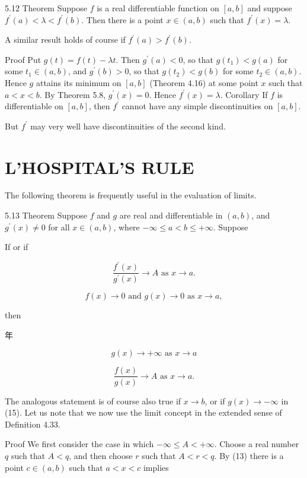 \documentclass[10pt]{article}
\begin{document}
5.12 Theorem Suppose $f$ is a real differentiable function on $[a, b]$ and suppose $f^{\prime}(a)<\lambda<f^{\prime}(b)$. Then there is a point $x \in(a, b)$ such that $f^{\prime}(x)=\lambda$.

A similar result holds of course if $f^{\prime}(a)>f^{\prime}(b)$.

Proof Put $g(t)=f(t)-\lambda t$. Then $g^{\prime}(a)<0$, so that $g\left(t_{1}\right)<g(a)$ for some $t_{1} \in(a, b)$, and $g^{\prime}(b)>0$, so that $g\left(t_{2}\right)<g(b)$ for some $t_{2} \in(a, b)$. Hence $g$ attains its minimum on $[a, b]$ (Theorem 4.16) at some point $x$ such that $a<x<b$. By Theorem 5.8, $g^{\prime}(x)=0$. Hence $f^{\prime}(x)=\lambda$. Corollary If $f$ is differentiable on $[a, b]$, then $f^{\prime}$ cannot have any simple discontinuities on $[a, b]$.

But $f^{\prime}$ may very well have discontinuities of the second kind.

\section{L'HOSPITAL'S RULE}
The following theorem is frequently useful in the evaluation of limits.

5.13 Theorem Suppose $f$ and $g$ are real and differentiable in $(a, b)$, and $g^{\prime}(x) \neq 0$ for all $x \in(a, b)$, where $-\infty \leq a<b \leq+\infty$. Suppose

If or if

$$
\frac{f^{\prime}(x)}{g^{\prime}(x)} \rightarrow A \text { as } x \rightarrow a .
$$

$$
f(x) \rightarrow 0 \text { and } g(x) \rightarrow 0 \text { as } x \rightarrow a,
$$

then

\begin{CJK}{UTF8}{mj}年\end{CJK}

$$
g(x) \rightarrow+\infty \text { as } x \rightarrow a
$$

$$
\frac{f(x)}{g(x)} \rightarrow A \text { as } x \rightarrow a .
$$

The analogous statement is of course also true if $x \rightarrow b$, or if $g(x) \rightarrow-\infty$ in (15). Let us note that we now use the limit concept in the extended sense of Definition 4.33.

Proof We first consider the case in which $-\infty \leq A<+\infty$. Choose a real number $q$ such that $A<q$, and then choose $r$ such that $A<r<q$. By (13) there is a point $c \in(a, b)$ such that $a<x<c$ implies
\end{document}
